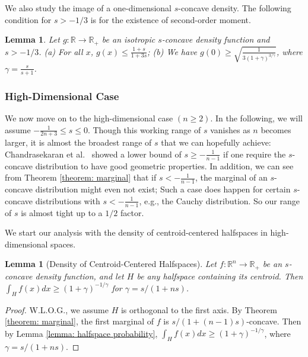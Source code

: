 \documentclass[11pt]{article}
\newcommand{\R}{\mathbb{R}}
\newtheorem{lemma}[theorem]{Lemma}
\begin{document}
We also study the image of a one-dimensional $s$-concave density. The following condition for $s> -1/3$ is for the existence of second-order moment.
\begin{lemma}
\label{lemma: bound for 1 dim}
Let $g:\mathbb{R}\rightarrow\mathbb{R}_+$ be an isotropic $s$-concave density function and $s> -1/3$.
(a) For all $x$, $g(x)\le \frac{1+s}{1+3s}$;
(b) We have $g(0)\ge\sqrt{\frac{1}{3(1+\gamma)^{3/\gamma}}}$, where $\gamma=\frac{s}{s+1}$.
\end{lemma}





\subsubsection{High-Dimensional Case}
We now move on to the high-dimensional case $(n\ge 2)$. In the following, we will assume $-\frac{1}{2n+3}\le s\le 0$. Though this working range of $s$ vanishes as $n$ becomes larger, it is almost the broadest range of $s$ that we can hopefully achieve: Chandrasekaran et al.~\cite{chandrasekaran2009sampling} showed a lower bound of $s\ge -\frac{1}{n-1}$ if one require the $s$-concave distribution to have good geometric properties. In addition, we can see from Theorem \ref{theorem: marginal} that if $s<-\frac{1}{n-1}$, the marginal of an $s$-concave distribution might even not exist; Such a case does happen for certain $s$-concave distributions with $s<-\frac{1}{n-1}$, e.g., the Cauchy distribution. So our range of $s$ is almost tight up to a $1/2$ factor.


We start our analysis with the density of centroid-centered halfspaces in high-dimensional spaces.
\begin{lemma}[Density of Centroid-Centered Halfspaces]
\label{lemma: probability of halfspace}
Let $f:\R^n\rightarrow\R_+$ be an $s$-concave density function, and let $H$ be any halfspace containing its centroid. Then
$\int_H f(x)dx\ge (1+\gamma)^{-1/\gamma}$
for $\gamma=s/(1+ns)$.
\end{lemma}
\begin{proof}
W.L.O.G., we assume $H$ is orthogonal to the first axis. By Theorem \ref{theorem: marginal}, the first marginal of $f$ is $s/(1+(n-1)s)$-concave. Then by Lemma \ref{lemma: halfspace probability},
$\int_H f(x)dx\ge (1+\gamma)^{-1/\gamma}$, where $\gamma=s/(1+ns)$.
\end{proof}
\end{document}
